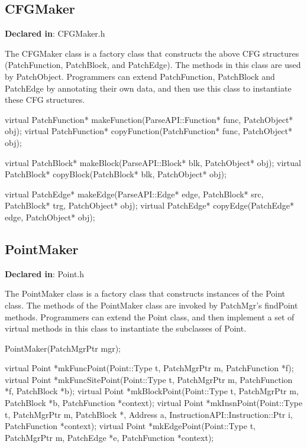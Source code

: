 \subsection{CFGMaker}
\label{sec-3.2.12}

\textbf{Declared in}: CFGMaker.h

The CFGMaker class is a factory class that constructs the above CFG structures
(PatchFunction, PatchBlock, and PatchEdge). The methods in this class are used
by PatchObject. Programmers can extend PatchFunction, PatchBlock and PatchEdge
by annotating their own data, and then use this class to instantiate these CFG
structures.


\begin{apient}
virtual PatchFunction* makeFunction(ParseAPI::Function* func, PatchObject* obj);
virtual PatchFunction* copyFunction(PatchFunction* func, PatchObject* obj);

virtual PatchBlock* makeBlock(ParseAPI::Block* blk, PatchObject* obj);
virtual PatchBlock* copyBlock(PatchBlock* blk, PatchObject* obj);

virtual PatchEdge* makeEdge(ParseAPI::Edge* edge, PatchBlock* src,
                            PatchBlock* trg, PatchObject* obj);
virtual PatchEdge* copyEdge(PatchEdge* edge, PatchObject* obj);
\end{apient}


\subsection{PointMaker}
\label{sec-3.2.13}

\textbf{Declared in}: Point.h

The PointMaker class is a factory class that constructs instances of the Point
class. The methods of the PointMaker class are invoked by PatchMgr's findPoint
methods. Programmers can extend the Point class, and then implement a set of
virtual methods in this class to instantiate the subclasses of Point.


\begin{apient}
PointMaker(PatchMgrPtr mgr);
\end{apient}


\begin{apient}
virtual Point *mkFuncPoint(Point::Type t, PatchMgrPtr m, PatchFunction *f);
virtual Point *mkFuncSitePoint(Point::Type t, PatchMgrPtr m, PatchFunction *f, PatchBlock *b);
virtual Point *mkBlockPoint(Point::Type t, PatchMgrPtr m, PatchBlock *b, PatchFunction *context);
virtual Point *mkInsnPoint(Point::Type t, PatchMgrPtr m, PatchBlock *, Address a,
                           InstructionAPI::Instruction::Ptr i, PatchFunction *context);
virtual Point *mkEdgePoint(Point::Type t, PatchMgrPtr m, PatchEdge *e, PatchFunction *context);
\end{apient}

